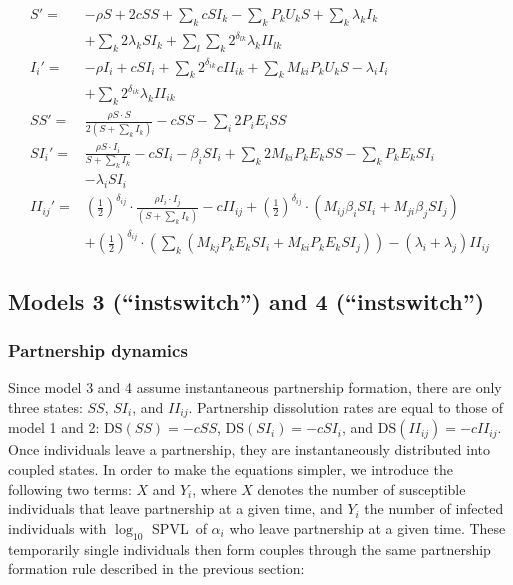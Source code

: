 \documentclass[10pt,letterpaper]{article}
\newcommand{\khalf}{\left(\frac{1}{2}\right)^{\delta_{ij}}}  %
\newcommand{\Lspvl}{$\log_{10}$ SPVL}
\newcommand{\DS}{\textrm{DS}}
\begin{document}
\begin{equation}
\begin{aligned}
S' =& - \rho S + 2 c SS + \sum_k c SI_k - \sum_k P_k U_k S + \sum_k \lambda_k I_k \\
&+ \sum_k 2 \lambda_k SI_k + \sum_l \sum_k  2^{\delta_{lk}} \lambda_k II_{lk}\\
I_i' =&  - \rho I_i + c SI_i + \sum_k 2^{\delta_{ik}} c  II_{ik} + \sum_k M_{ki} P_k U_k S- \lambda_i I_i \\
&+ \sum_k 2^{\delta_{ik}} \lambda_k II_{ik} \\
SS' =& \frac{\rho S \cdot S}{2 (S + \sum_k I_k)} - c SS - \sum_i 2 P_i E_i SS \\
SI_i' =& \frac{\rho S \cdot I_i}{S + \sum_k I_k} - c SI_i - \beta_i SI_i + \sum_k 2 M_{ki} P_k E_k SS - \sum_k P_k E_k SI_i   \\
&- \lambda_i SI_i\\
II_{ij}' =& \khalf \cdot \frac{\rho I_i \cdot I_j}{(S + \sum_k I_k)} - c II_{ij} + \khalf \cdot (M_{ij} \beta_i SI_i + M_{ji} \beta_j SI_j) \\
&+ \khalf \cdot (\sum_k (M_{kj} P_k E_k SI_i + M_{ki} P_k E_k SI_j)) -(\lambda_i + \lambda_j) II_{ij}
\end{aligned}
\end{equation}

\subsection*{Models 3 (``instswitch'') and 4 (``instswitch'')}
\subsubsection*{Partnership dynamics}

Since model 3 and 4 assume instantaneous partnership formation, there are only three states: $SS$, $SI_i$, and $II_{ij}$. Partnership dissolution rates are equal to those of model 1 and 2: $\DS(SS) = -cSS$, $\DS(SI_i) = - cSI_i$, and $\DS(II_{ij}) = - c II_{ij}$. Once individuals leave a partnership, they are instantaneously distributed into coupled states. In order to make the equations simpler, we introduce the following two terms: $X$ and $Y_i$, where $X$ denotes the number of susceptible individuals that leave partnership at a given time, and $Y_i$ the number of infected individuals with \Lspvl\ of $\alpha_i$ who leave partnership at a given time. These temporarily single individuals then form couples through the same partnership formation rule described in the previous section:
\end{document}
